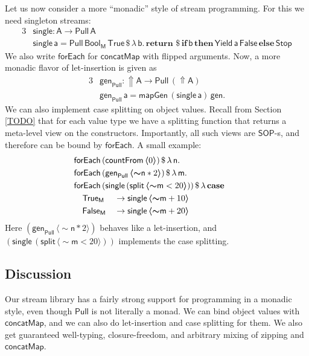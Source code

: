 \documentclass[acmsmall,screen,review,anonymous]{acmart}
\newcommand{\mit}[1]{{\mathsf{#1}}}
\newcommand{\msf}[1]{{\mathsf{#1}}}
\newcommand{\mbf}[1]{{\mathbf{#1}}}
\newcommand{\bs}[1]{\boldsymbol{#1}}
\newcommand{\ind}{\hspace{1em}}
\newcommand{\return}{\mbf{return}\,}
\newcommand{\lam}{\lambda\,}
\newcommand{\M}{\msf{M}}
\newcommand{\vm}{\mathsf{m}}
\newcommand{\vn}{\mathsf{n}}
\newcommand{\vA}{\mathsf{A}}
\newcommand{\va}{\mathsf{a}}
\newcommand{\vb}{\mathsf{b}}
\newcommand{\SOP}{\msf{SOP}}
\newcommand{\forEach}{\msf{forEach}}
\newcommand{\single}{\msf{single}}
\newcommand{\msplit}{\msf{split}}
\newcommand{\Bool}{\msf{Bool}}
\newcommand{\case}{\mbf{case\,}}
\newcommand{\concatMap}{\msf{concatMap}}
\newcommand{\Lift}{{\Uparrow}}
\newcommand{\spl}{{\bs{\sim}}}
\newcommand{\ql}{{\bs{\langle}}}
\newcommand{\qr}{{\bs{\rangle}}}
\newcommand{\True}{\msf{True}}
\newcommand{\False}{\msf{False}}
\theoremstyle{remark}
\newcommand{\gen}{\mit{gen}}
\newcommand{\qt}[1]{\ql#1\qr}
\newcommand{\Stop}{\msf{Stop}}
\newcommand{\Yield}{\msf{Yield}}
\newcommand{\dlr}{\,\$\,}
\newcommand{\Pull}{\msf{Pull}}
\begin{document}
Let us now consider a more ``monadic'' style of stream programming. For this we
need singleton streams:
\begin{alignat*}{3}
  & \mit{single} : \vA \to \Pull\,\vA \\
  & \mit{single}\,\va = \Pull\,\Bool_\M\,\True \dlr \lam \vb.\,\return \dlr\mbf{if}\,\vb\,\mbf{then}\,\Yield\,\va\,\False\,\mbf{else}\,\Stop
\end{alignat*}
We also write $\mit{forEach}$ for $\concatMap$ with flipped arguments. Now, a
more monadic flavor of let-insertion is given as
\begin{alignat*}{3}
  &\gen_{\Pull} : \Lift \vA \to \Pull\,(\Lift \vA) \\
  &\gen_{\Pull}\,\va = \mit{mapGen}\,(\mit{single}\,\va)\,\gen.
\end{alignat*}
We can also implement case splitting on object values. Recall from Section
\ref{TODO} that for each value type we have a splitting function that returns a
meta-level view on the constructors. Importantly, all such views are $\SOP$-s, and
therefore can be bound by $\forEach$. A small example:
\begin{alignat*}{3}
  & \hspace{-5em}\mathrlap{\forEach\,(\mit{countFrom}\,\qt{0}) \dlr \lam \vn. }\\
  & \hspace{-5em}\mathrlap{\forEach\,(\gen_{\Pull}\,\qt{\spl \vn * 2}) \dlr \lam \vm. }\\
  & \hspace{-5em}\mathrlap{\forEach\,(\single\,(\msplit\,\qt{\spl \vm < 20})) \dlr \lam \case }\\
  & \hspace{-5em}\ind \True_\M  &&\to \single\,\qt{\spl \vm + 10}   \\
  & \hspace{-5em}\ind \False_\M &&\to \single\,\qt{\spl \vm + 20}
\end{alignat*}
Here $(\gen_{\Pull}\,\qt{\spl \vn * 2})$ behaves like a let-insertion, and
$(\single\,(\msplit\,\qt{\spl \vm < 20}))$ implements the case splitting.

\subsection{Discussion}

Our stream library has a fairly strong support for programming in a monadic
style, even though $\Pull$ is not literally a monad. We can bind object values
with $\concatMap$, and we can also do let-insertion and case splitting for
them. We also get guaranteed well-typing, closure-freedom, and arbitrary mixing
of zipping and $\concatMap$.
\end{document}
